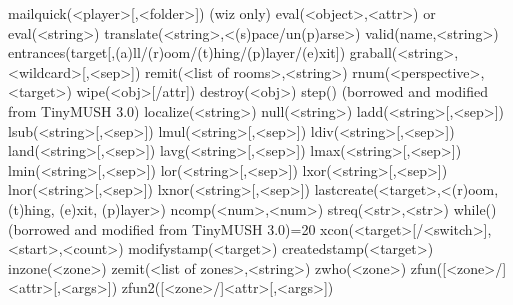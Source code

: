 \documentclass[letterpaper,10pt,english]{sphinxmanual}
\begin{document}
\sphinxAtStartPar
mailquick(\textless{}player\textgreater{}{[},\textless{}folder\textgreater{}{]}) (wiz only)
eval(\textless{}object\textgreater{},\textless{}attr\textgreater{}) or eval(\textless{}string\textgreater{})
translate(\textless{}string\textgreater{},\textless{}(s)pace/un(p)arse\textgreater{})
valid(name,\textless{}string\textgreater{})
entrances(target{[},(a)ll/(r)oom/(t)hing/(p)layer/(e)xit{]})
graball(\textless{}string\textgreater{},\textless{}wildcard\textgreater{}{[},\textless{}sep\textgreater{}{]})
remit(\textless{}list of rooms\textgreater{},\textless{}string\textgreater{})
rnum(\textless{}perspective\textgreater{},\textless{}target\textgreater{})
wipe(\textless{}obj\textgreater{}{[}/attr{]})
destroy(\textless{}obj\textgreater{})
step() (borrowed and modified from TinyMUSH 3.0)
localize(\textless{}string\textgreater{})
null(\textless{}string\textgreater{})
ladd(\textless{}string\textgreater{}{[},\textless{}sep\textgreater{}{]})
lsub(\textless{}string\textgreater{}{[},\textless{}sep\textgreater{}{]})
lmul(\textless{}string\textgreater{}{[},\textless{}sep\textgreater{}{]})
ldiv(\textless{}string\textgreater{}{[},\textless{}sep\textgreater{}{]})
land(\textless{}string\textgreater{}{[},\textless{}sep\textgreater{}{]})
lavg(\textless{}string\textgreater{}{[},\textless{}sep\textgreater{}{]})
lmax(\textless{}string\textgreater{}{[},\textless{}sep\textgreater{}{]})
lmin(\textless{}string\textgreater{}{[},\textless{}sep\textgreater{}{]})
lor(\textless{}string\textgreater{}{[},\textless{}sep\textgreater{}{]})
lxor(\textless{}string\textgreater{}{[},\textless{}sep\textgreater{}{]})
lnor(\textless{}string\textgreater{}{[},\textless{}sep\textgreater{}{]})
lxnor(\textless{}string\textgreater{}{[},\textless{}sep\textgreater{}{]})
lastcreate(\textless{}target\textgreater{},\textless{}(r)oom, (t)hing, (e)xit, (p)layer\textgreater{})
ncomp(\textless{}num\textgreater{},\textless{}num\textgreater{})
streq(\textless{}str\textgreater{},\textless{}str\textgreater{})
while() (borrowed and modified from TinyMUSH 3.0)=20
xcon(\textless{}target\textgreater{}{[}/\textless{}switch\textgreater{}{]},\textless{}start\textgreater{},\textless{}count\textgreater{})
modifystamp(\textless{}target\textgreater{})
createdstamp(\textless{}target\textgreater{})
inzone(\textless{}zone\textgreater{})
zemit(\textless{}list of zones\textgreater{},\textless{}string\textgreater{})
zwho(\textless{}zone\textgreater{})
zfun({[}\textless{}zone\textgreater{}/{]}\textless{}attr\textgreater{}{[},\textless{}args\textgreater{}{]})
zfun2({[}\textless{}zone\textgreater{}/{]}\textless{}attr\textgreater{}{[},\textless{}args\textgreater{}{]})
\end{document}

